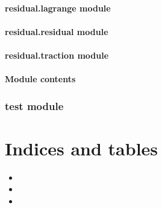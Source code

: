 \documentclass[letterpaper,10pt,english]{sphinxmanual}
\begin{document}
\subsubsection{residual.lagrange module}
\label{\detokenize{residual:residual-lagrange-module}}

\subsubsection{residual.residual module}
\label{\detokenize{residual:residual-residual-module}}

\subsubsection{residual.traction module}
\label{\detokenize{residual:residual-traction-module}}

\subsubsection{Module contents}
\label{\detokenize{residual:module-residual}}\label{\detokenize{residual:module-contents}}

\subsection{test module}
\label{\detokenize{test:test-module}}\label{\detokenize{test::doc}}

\chapter{Indices and tables}
\label{\detokenize{index:indices-and-tables}}\begin{itemize}
\item {} 

\item {} 

\item {} 

\end{itemize}
\end{document}
